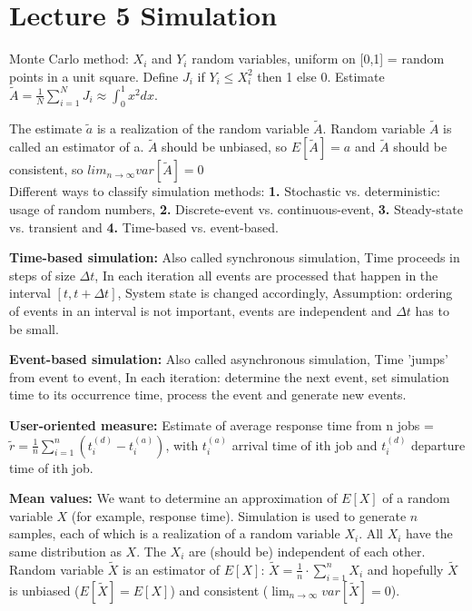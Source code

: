 \section{Lecture 5 Simulation}
Monte Carlo method: $X_{i}$ and $Y_{i}$ random variables, uniform on [0,1] = random points in a unit square. Define $J_{i}$ if $Y_{i} \leq X_{i}^{2}$ then 1 else 0. Estimate $\widetilde{A} = \frac{1}{N} \sum_{i=1}^{N} J_{i} \approx \int_{0}^{1} x^2 dx$.

The estimate $\widetilde{a}$ is a realization of the random variable $\widetilde{A}$. Random variable $\widetilde{A}$ is called an estimator of a. $\widetilde{A}$ should be unbiased, so $E[\widetilde{A}] = a$ and $\widetilde{A}$ should be consistent, so $lim_{n\rightarrow\infty} var[\widetilde{A}] = 0$\\

Different ways to classify simulation methods: \textbf{1.} Stochastic vs. deterministic: usage of random numbers, \textbf{2.} Discrete-event vs. continuous-event, \textbf{3.} Steady-state vs. transient and \textbf{4.} Time-based vs. event-based.

\textbf{Time-based simulation:} Also called synchronous simulation, Time proceeds in steps of size $\Delta t$, In each iteration all events are processed that happen in the interval $[t,t + \Delta t]$, System state is changed accordingly, Assumption: ordering of events in an interval is not important, events are independent and $\Delta t$ has to be small.

\textbf{Event-based simulation:} Also called asynchronous simulation, Time 'jumps' from event to event, In each iteration: determine the next event, set simulation time to its occurrence time, process the event and generate new events.

\textbf{User-oriented measure:} Estimate of average response time from n jobs = $\widetilde{r} = \frac{1}{n} \sum_{i=1}^{n}(t_{i}^{(d)} - t_{i}^{(a)})$, with $t_{i}^{(a)}$ arrival time of ith job and $t_{i}^{(d)}$ departure time of ith job.

\textbf{Mean values:} We want to determine an approximation of $E[X]$ of a random variable $X$ (for example, response time). Simulation is used to generate $n$ samples, each of which is a
realization of a random variable $X_i$. All $X_i$ have the same distribution as $X$. The $X_i$ are (should be) independent of each other. Random variable $\widetilde{X}$ is an estimator of $E[X]$: $\widetilde{X} = \frac{1}{n} \cdot \sum^{n}_{i=1} X_{i}$ and hopefully $\widetilde{X}$ is unbiased ($E[\widetilde{X}] = E[X]$) and consistent ($\lim_{n \rightarrow \infty} var[\widetilde{X}] = 0$).

